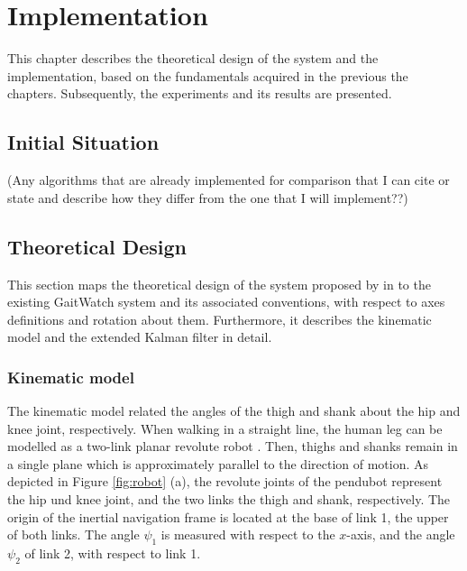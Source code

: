 \chapter{Implementation}
\label{ch:Implementation}

This chapter describes the theoretical design of the system and the implementation, based on the fundamentals acquired in the previous the chapters. Subsequently, the experiments and its results are presented.

\section{Initial Situation}

 (Any algorithms that are already implemented for comparison that I can cite or state and describe how they differ from the one that I will implement??)

\section{Theoretical Design}\label{sec:theoretical_design}

This section maps the theoretical design of the system proposed by \citeauthor{bennett_motion_2014} in \cite{bennett_motion_2014} to the existing GaitWatch system and its associated conventions, with respect to axes definitions and rotation about them. Furthermore, it describes the kinematic model and the extended Kalman filter in detail.

\subsection{Kinematic model}

The kinematic model related the angles of the thigh and shank about the hip and knee joint, respectively. When walking in a straight line, the human leg can be modelled as a two-link planar revolute robot \cite{bennett_motion_2014}. Then, thighs and shanks remain in a single plane which is approximately parallel to the direction of motion. As depicted in Figure \ref{fig:robot} (a), the revolute joints of the \gls{pendubot} represent the hip und knee joint, and the two links the thigh and shank, respectively. The origin of the inertial navigation frame is located at the base of link 1, the upper of both links. The angle $\psi_1$ is measured with respect to the $x$-axis, and the angle $\psi_2$ of link 2, with respect to link 1. 

